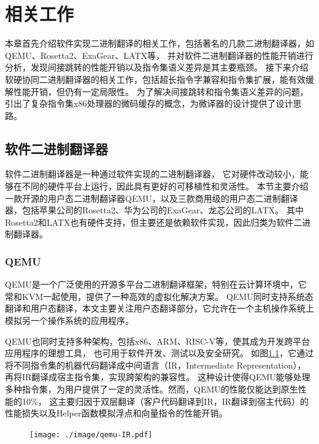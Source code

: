 \chapter{相关工作}\label{chap:related_work}

本章首先介绍软件实现二进制翻译的相关工作，包括著名的几款二进制翻译器，如QEMU、Rosetta2、ExaGear、LATX等，
并对软件二进制翻译器的性能开销进行分析，发现间接跳转的性能开销以及指令集语义差异是其主要瓶颈。
接下来介绍软硬协同二进制翻译器的相关工作，包括超长指令字兼容和指令集扩展，能有效缓解性能开销，但仍有一定局限性。
为了解决间接跳转和指令集语义差异的问题，引出了复杂指令集x86处理器的微码缓存的概念，为微译器的设计提供了设计思路。

\section{软件二进制翻译器}

软件二进制翻译器是一种通过软件实现的二进制翻译器，
它对硬件改动较小，能够在不同的硬件平台上运行，因此具有更好的可移植性和灵活性。
本节主要介绍一款开源的用户态二进制翻译器QEMU，以及三款商用级的用户态二进制翻译器，包括苹果公司的Rosetta2、华为公司的ExaGear、龙芯公司的LATX。
其中Rosetta2和LATX也有硬件支持，但主要还是依赖软件实现，因此归类为软件二进制翻译器。

\subsection{QEMU}

QEMU是一个广泛使用的开源多平台二进制翻译框架，特别在云计算环境中，它常和KVM一起使用，提供了一种高效的虚拟化解决方案。
QEMU同时支持系统态翻译和用户态翻译，本文主要关注用户态翻译部分，它允许在一个主机操作系统上模拟另一个操作系统的应用程序。

QEMU也同时支持多种架构，包括x86、ARM、RISC-V等，使其成为开发跨平台应用程序的理想工具， 也可用于软件开发、测试以及安全研究。
如图\ref{img:qemu_arch}，它通过将不同指令集的机器代码翻译成中间语言（IR，Intermediate Representation），再将IR翻译成宿主指令集，实现跨架构的兼容性。
这种设计使得QEMU能够处理多种指令集，为用户提供了一定的灵活性。然而，QEMU的性能仅能达到原生性能的10\%，
这主要归因于双层翻译（客户代码翻译到IR，IR翻译到宿主代码）的性能损失以及Helper函数模拟浮点和向量指令的性能开销\cite{deflater}。

\begin{figure}[!htbp]
  \centering
  \texttt{[image: ./image/qemu-IR.pdf]}
  \label{img:qemu_arch}
\end{figure}

